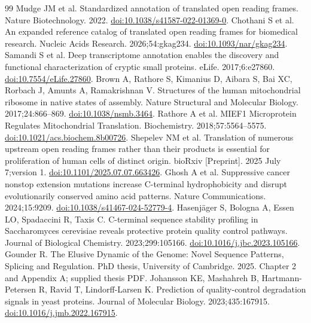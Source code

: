 \documentclass[11pt,a4paper]{article}
\begin{document}
\clearpage
\begin{thebibliography}{99}
 Mudge JM et al. Standardized annotation of translated open reading frames. Nature Biotechnology. 2022. \href{https://doi.org/10.1038/s41587-022-01369-0}{doi:10.1038/s41587-022-01369-0}.
 Chothani S et al. An expanded reference catalog of translated open reading frames for biomedical research. Nucleic Acids Research. 2026;54:gkag234. \href{https://doi.org/10.1093/nar/gkag234}{doi:10.1093/nar/gkag234}.
 Samandi S et al. Deep transcriptome annotation enables the discovery and functional characterization of cryptic small proteins. eLife. 2017;6:e27860. \href{https://doi.org/10.7554/eLife.27860}{doi:10.7554/eLife.27860}.
 Brown A, Rathore S, Kimanius D, Aibara S, Bai XC, Rorbach J, Amunts A, Ramakrishnan V. Structures of the human mitochondrial ribosome in native states of assembly. Nature Structural and Molecular Biology. 2017;24:866--869. \href{https://doi.org/10.1038/nsmb.3464}{doi:10.1038/nsmb.3464}.
 Rathore A et al. MIEF1 Microprotein Regulates Mitochondrial Translation. Biochemistry. 2018;57:5564--5575. \href{https://doi.org/10.1021/acs.biochem.8b00726}{doi:10.1021/acs.biochem.8b00726}.
 Shepelev NM et al. Translation of numerous upstream open reading frames rather than their products is essential for proliferation of human cells of distinct origin. bioRxiv [Preprint]. 2025 July 7;version 1. \href{https://doi.org/10.1101/2025.07.07.663426}{doi:10.1101/2025.07.07.663426}.
 Ghosh A et al. Suppressive cancer nonstop extension mutations increase C-terminal hydrophobicity and disrupt evolutionarily conserved amino acid patterns. Nature Communications. 2024;15:9209. \href{https://doi.org/10.1038/s41467-024-52779-4}{doi:10.1038/s41467-024-52779-4}.
 Hasenj{\"a}ger S, Bologna A, Essen LO, Spadaccini R, Taxis C. C-terminal sequence stability profiling in Saccharomyces cerevisiae reveals protective protein quality control pathways. Journal of Biological Chemistry. 2023;299:105166. \href{https://doi.org/10.1016/j.jbc.2023.105166}{doi:10.1016/j.jbc.2023.105166}.
 Gounder R. The Elusive Dynamic of the Genome: Novel Sequence Patterns, Splicing and Regulation. PhD thesis, University of Cambridge. 2025. Chapter 2 and Appendix A; supplied thesis PDF.
 Johansson KE, Mashahreh B, Hartmann-Petersen R, Ravid T, Lindorff-Larsen K. Prediction of quality-control degradation signals in yeast proteins. Journal of Molecular Biology. 2023;435:167915. \href{https://doi.org/10.1016/j.jmb.2022.167915}{doi:10.1016/j.jmb.2022.167915}.

\end{thebibliography}
\end{document}
